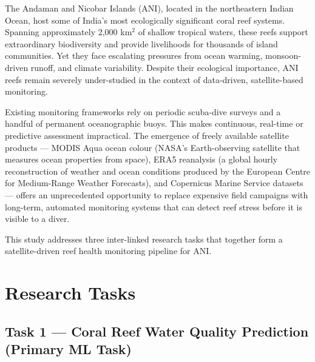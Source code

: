 \documentclass[12pt,a4paper]{report}
\begin{document}
The Andaman and Nicobar Islands (ANI), located in the northeastern Indian Ocean, host
some of India's most ecologically significant coral reef systems. Spanning approximately
2,000 km$^2$ of shallow tropical waters, these reefs support extraordinary biodiversity
and provide livelihoods for thousands of island communities. Yet they face escalating
pressures from ocean warming, monsoon-driven runoff, and climate variability. Despite
their ecological importance, ANI reefs remain severely under-studied in the context of
data-driven, satellite-based monitoring.

Existing monitoring frameworks rely on periodic scuba-dive surveys and a handful of
permanent oceanographic buoys. This makes continuous, real-time or predictive assessment
impractical. The emergence of freely available satellite products — MODIS Aqua ocean
colour (NASA's Earth-observing satellite that measures ocean properties from space),
ERA5 reanalysis (a global hourly reconstruction of weather and ocean conditions produced
by the European Centre for Medium-Range Weather Forecasts), and Copernicus Marine Service
datasets — offers an unprecedented opportunity to replace expensive field campaigns with
long-term, automated monitoring systems that can detect reef stress before it is visible
to a diver.

This study addresses three inter-linked research tasks that together form a satellite-driven
reef health monitoring pipeline for ANI.

\section{Research Tasks}

\subsection*{Task 1 — Coral Reef Water Quality Prediction (Primary ML Task)}
\end{document}
